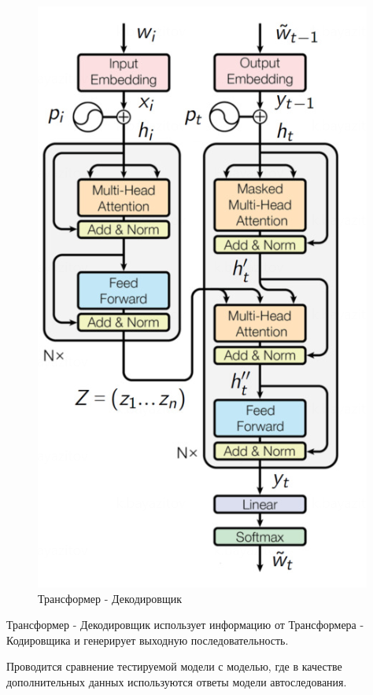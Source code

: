 \begin{figure}[H]
\begin{minipage}{0.25\textwidth}
        \includegraphics[width=\textwidth]{results/transformer_decoder.png}
        \caption{Трансформер - Декодировщик}
    \end{minipage}
\end{figure}

Трансформер - Декодировщик использует информацию от Трансформера - Кодировщика и генерирует выходную последовательность.

\newpage

Проводится сравнение тестируемой модели с моделью, где в качестве дополнительных данных используются ответы модели автоследования.

